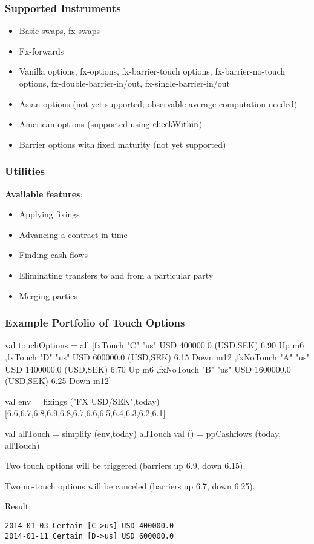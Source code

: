 \documentclass[xcolor=dvipsnames,11pt]{beamer}
\renewcommand{\emph}[1]{\textcolor{structure!90}{#1}}
\newcommand{\ttt}[1]{\mbox{\cd{#1}}}
\begin{document}
\begin{frame}
\frametitle{Supported Instruments}
\begin{itemize}
\item Basic swaps, fx-swaps
\item Fx-forwards
\item Vanilla options, fx-options, fx-barrier-touch options, fx-barrier-no-touch options, fx-double-barrier-in/out, fx-single-barrier-in/out
\item Asian options (not yet supported; observable average computation needed)
\item American options (supported using $\ttt{checkWithin}$)
\item Barrier options with fixed maturity (not yet supported)
\end{itemize}
\end{frame}

\begin{frame}
\frametitle{Utilities}

\textbf{Available features}:
\begin{itemize}
  \item Applying fixings
  \item Advancing a contract in time
  \item Finding cash flows
  \item Eliminating transfers to and from a particular party
  \item Merging parties
\end{itemize}
\end{frame}


\begin{frame}[fragile,t]
\frametitle{Example Portfolio of Touch Options}

\begin{mlcodesmall}
val touchOptions = all
 [fxTouch   "C" "us" USD  400000.0 (USD,SEK) 6.90 Up   m6
 ,fxTouch   "D" "us" USD  600000.0 (USD,SEK) 6.15 Down m12
 ,fxNoTouch "A" "us" USD 1400000.0 (USD,SEK) 6.70 Up   m6
 ,fxNoTouch "B" "us" USD 1600000.0 (USD,SEK) 6.25 Down m12]

val env = fixings ("FX USD/SEK",today) 
   [6.6,6.7,6.8,6.9,6.8,6.7,6.6,6.5,6.4,6.3,6.2,6.1]

val allTouch = simplify (env,today) allTouch
val () = ppCashflows (today, allTouch)
\end{mlcodesmall}

{\scriptsize
Two touch options will be triggered (barriers up 6.9, down 6.15).

Two no-touch options will be canceled (barriers up 6.7, down 6.25).
}
\vfill
\emph{Result:}
\begin{verbatim}
2014-01-03 Certain [C->us] USD 400000.0
2014-01-11 Certain [D->us] USD 600000.0
\end{verbatim}

\end{frame}
\end{document}
